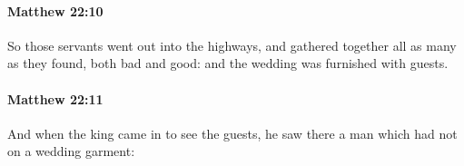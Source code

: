 		\paragraph{Matthew 22:10} %
			\label{MATTHEW-22-10}

			So those servants went out into the highways, and gathered together all as many as they found, both bad and good: and the wedding was furnished with guests.

			\begin{framed}
			\scriptsize
				\begin{compactdesc}
					\item[SBLG] 
				\end{compactdesc}
			\end{framed}

		\paragraph{Matthew 22:11} %
			\label{MATTHEW-22-11}

			And when the king came in to see the guests, he saw there a man which had not on a wedding garment:

